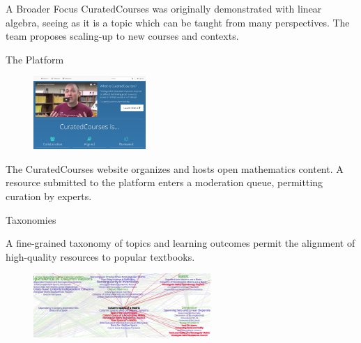 
\begin{sectionblock}{A Broader Focus}
  CuratedCourses was originally demonstrated with linear algebra,
  seeing as it is a topic which can be taught from many perspectives.
  The team proposes scaling-up to new courses and contexts.
\end{sectionblock}

\vspace{1ex}

\begin{sectionblock}{The Platform}

  \begin{figure}
    \includegraphics[width=0.38\textwidth]{landing-page.png}
  \end{figure}

  The CuratedCourses website organizes and hosts open mathematics content.  A resource submitted to the
  platform enters a moderation queue, permitting curation by experts.
\end{sectionblock}

\vspace{1ex}

  \begin{sectionblock}{Taxonomies}
  
    A fine-grained taxonomy of
   topics and learning outcomes
  permit the alignment of high-quality resources to popular textbooks.

    \begin{figure}
      \includegraphics[width=0.6\textwidth]{topics.png}
    \end{figure}
  
\end{sectionblock}


    
